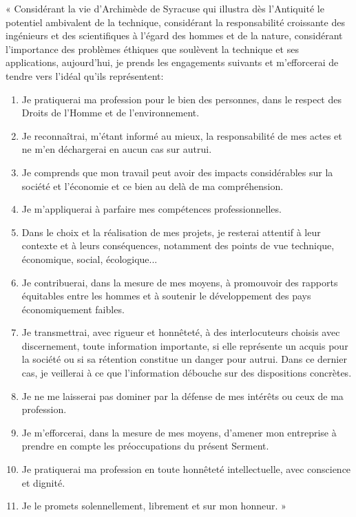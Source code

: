 	« Consid\'erant la vie d'Archimède de Syracuse qui illustra dès l'Antiquit\'e le potentiel ambivalent de la technique, consid\'erant la responsabilit\'e croissante des ing\'enieurs et des scientifiques à l'\'egard des hommes et de la nature, consid\'erant l'importance des problèmes \'ethiques que soulèvent la technique et ses applications, aujourd'hui, je prends les engagements suivants et m'efforcerai de tendre vers l'id\'eal qu'ils repr\'esentent:\\
	\begin{enumerate}[label=\protect\circledbullet{\arabic*},leftmargin=15mm]
		\item Je pratiquerai ma profession pour le bien des personnes, dans le respect des Droits de l'Homme et de l'environnement.

		\item Je reconnaîtrai, m'\'etant inform\'e au mieux, la responsabilit\'e de mes actes et ne m'en d\'echargerai en aucun cas sur autrui.

		\item Je comprends que mon travail peut avoir des impacts consid\'erables sur la soci\'et\'e et l'\'economie et ce bien au delà de ma compr\'ehension.

		\item Je m'appliquerai à parfaire mes comp\'etences professionnelles.

		\item Dans le choix et la r\'ealisation de mes projets, je resterai attentif à leur contexte et à leurs cons\'equences, notamment des points de vue technique, \'economique, social, \'ecologique...

		\item Je contribuerai, dans la mesure de mes moyens, à promouvoir des rapports \'equitables entre les hommes et à soutenir le d\'eveloppement des pays \'economiquement faibles.

		\item Je transmettrai, avec rigueur et honnêtet\'e, à des interlocuteurs choisis avec discernement, toute information importante, si elle repr\'esente un acquis pour la soci\'et\'e ou si sa r\'etention constitue un danger pour autrui. Dans ce dernier cas, je veillerai à ce que l'information d\'ebouche sur des dispositions concrètes.

		\item Je ne me laisserai pas dominer par la d\'efense de mes int\'erêts ou ceux de ma profession.

		\item Je m'efforcerai, dans la mesure de mes moyens, d'amener mon entreprise à prendre en compte les pr\'eoccupations du pr\'esent Serment.

		\item Je pratiquerai ma profession en toute honnêtet\'e intellectuelle, avec conscience et dignit\'e.
		
		\item Je le promets solennellement, librement et sur mon honneur. »\\ 
\end{enumerate}
